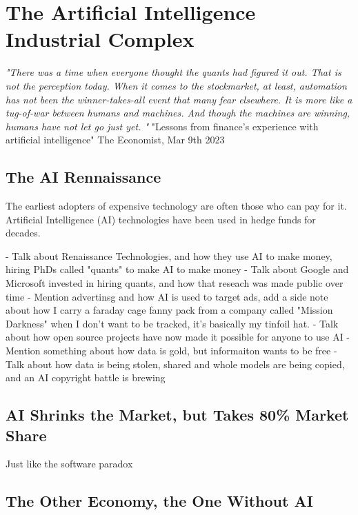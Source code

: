 \setchapterpreamble[u]{\margintoc}
\chapter{The Artificial Intelligence Industrial Complex}

\textit{"There was a time when everyone thought the quants had figured it out. That is not the perception today. When it comes to the stockmarket, at least, automation has not been the winner-takes-all event that many fear elsewhere. It is more like a tug-of-war between humans and machines. And though the machines are winning, humans have not let go just yet. "} "Lessons from finance's experience with artificial intelligence" The Economist, Mar 9th 2023 \cite{finaieconomist}


\section{The AI Rennaissance}

The earliest adopters of expensive technology are often those who can pay for it. Artificial Intelligence (AI) technologies have been used in hedge funds for decades.

- Talk about Renaissance Technologies, and how they use AI to make money, hiring PhDs called "quants" to make AI to make money
- Talk about Google and Microsoft invested in hiring quants, and how that reseach was made public over time
- Mention advertinsg and how AI is used to target ads, add a side note about how I carry a faraday cage fanny pack from a company called "Mission Darkness" when I don't want to be tracked, it's basically my tinfoil hat.
- Talk about how open source projects have now made it possible for anyone to use AI
-Mention something about how data is gold, but informaiton wants to be free
-Talk about how data is being stolen, shared and whole models are being copied, and an AI copyright battle is brewing


\section{AI Shrinks the Market, but Takes 80\% Market Share}

Just like the software paradox 

\section{The Other Economy, the One Without AI}

